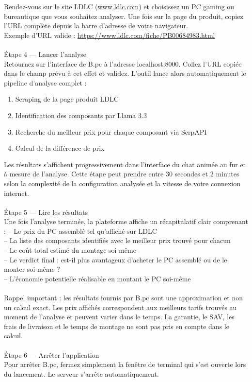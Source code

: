 \documentclass[a4paper, 12pt, twoside]{article}
\begin{document}
Rendez-vous sur le site LDLC (\href{http://www.ldlc.com/}{www.ldlc.com}) et choisissez un PC gaming ou bureautique que vous souhaitez analyser. Une fois sur la page du produit, copiez l'URL complète depuis la barre d'adresse de votre navigateur.\\
Exemple d'URL valide : \href{https://www.ldlc.com/fiche/PB00684983.html}{https://www.ldlc.com/fiche/PB00684983.html}\\
\\
Étape 4 — Lancer l'analyse\\

Retournez sur l'interface de B.pc à l'adresse localhost:8000. Collez l'URL copiée dans le champ prévu à cet effet et validez. L'outil lance alors automatiquement le pipeline d'analyse complet :

\begin{enumerate}
    \item Scraping de la page produit LDLC
    \item Identification des composants par Llama 3.3
    \item Recherche du meilleur prix pour chaque composant via SerpAPI
    \item Calcul de la différence de prix
\end{enumerate}
Les résultats s'affichent progressivement dans l'interface du chat animée au fur et à mesure de l'analyse. Cette étape peut prendre entre 30 secondes et 2 minutes selon la complexité de la configuration analysée et la vitesse de votre connexion internet.\\
\\
Étape 5 — Lire les résultats\\

Une fois l'analyse terminée, la plateforme affiche un récapitulatif clair comprenant :
– Le prix du PC assemblé tel qu'affiché sur LDLC\\
– La liste des composants identifiés avec le meilleur prix trouvé pour chacun\\
– Le coût total estimé du montage soi-même\\
– Le verdict final : est-il plus avantageux d'acheter le PC assemblé ou de le monter soi-même ?\\
– L'économie potentielle réalisable en montant le PC soi-même\\
\\
Rappel important : les résultats fournis par B.pc sont une approximation et non un calcul exact. Les prix affichés correspondent aux meilleurs tarifs trouvés au moment de l'analyse et peuvent varier dans le temps. La garantie, le SAV, les frais de livraison et le temps de montage ne sont pas pris en compte dans le calcul.\\
\\
Étape 6 — Arrêter l'application\\

Pour arrêter B.pc, fermez simplement la fenêtre de terminal qui s'est ouverte lors du lancement. Le serveur s'arrête automatiquement.
\end{document}
